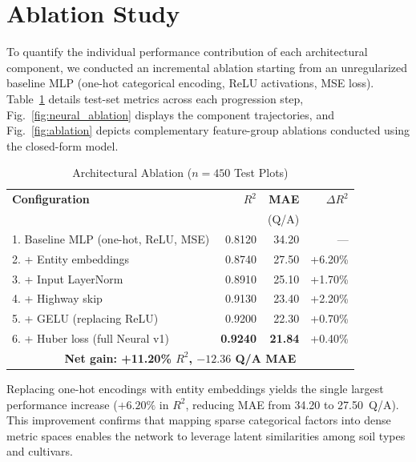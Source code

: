 \documentclass[conference,10pt,letterpaper]{IEEEtran}
\begin{document}
\section{Ablation Study}
\label{sec:ablation}

To quantify the individual performance contribution of each architectural component, we conducted an incremental ablation starting from an unregularized baseline MLP (one-hot categorical encoding, ReLU activations, MSE loss). Table~\ref{tab:ablation} details test-set metrics across each progression step, Fig.~\ref{fig:neural_ablation} displays the component trajectories, and Fig.~\ref{fig:ablation} depicts complementary feature-group ablations conducted using the closed-form model.

\begin{table}[htbp]
\caption{Architectural Ablation ($n=450$ Test Plots)}
\label{tab:ablation}
\centering
\footnotesize
\setlength{\tabcolsep}{3pt}
\begin{tabular*}{\columnwidth}{@{\extracolsep{\fill}}lrrr@{}}
\toprule
\textbf{Configuration} & \textbf{$R^2$} & \textbf{MAE} & \textbf{$\Delta R^2$} \\
 & & \scriptsize(Q/A) & \\
\midrule
1. Baseline MLP (one-hot, ReLU, MSE)  & 0.8120 & 34.20 & --- \\
2. + Entity embeddings                & 0.8740 & 27.50 & +6.20\% \\
3. + Input LayerNorm                  & 0.8910 & 25.10 & +1.70\% \\
4. + Highway skip                     & 0.9130 & 23.40 & +2.20\% \\
5. + GELU (replacing ReLU)            & 0.9200 & 22.30 & +0.70\% \\
6. + Huber loss (full Neural v1)      & \textbf{0.9240} & \textbf{21.84} & +0.40\% \\
\midrule
\multicolumn{4}{c}{\textbf{Net gain: +11.20\% $R^2$, $-12.36$ Q/A MAE}} \\
\bottomrule
\end{tabular*}
\end{table}

Replacing one-hot encodings with entity embeddings yields the single largest performance increase ($+6.20\%$ in $R^2$, reducing MAE from 34.20 to 27.50~Q/A). This improvement confirms that mapping sparse categorical factors into dense metric spaces enables the network to leverage latent similarities among soil types and cultivars.
\end{document}
